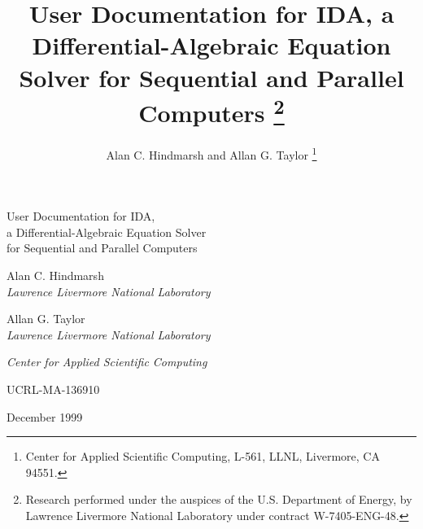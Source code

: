 



\setlength{\oddsidemargin}{0in}
\setlength{\evensidemargin}{0in}
\setlength{\textwidth}{6.5in}


\title{User Documentation for IDA, a Differential-Algebraic Equation
       Solver for Sequential and Parallel Computers%
\thanks{
Research performed under the auspices of the U.S.
Department of Energy, by Lawrence Livermore National Laboratory under
contract W-7405-ENG-48. } }

\author{Alan C. Hindmarsh and Allan G. Taylor%
\thanks{Center for Applied Scientific Computing, L-561,
        LLNL, Livermore, CA 94551.} }



\thispagestyle{empty}

%
%

%
\vspace*{\fill}
\vspace*{0.1in}

\begin{center}

\LARGE
User Documentation for IDA, \\ a Differential-Algebraic Equation Solver \\
       for Sequential and Parallel Computers

\par\vspace*{0.7in}
\large
Alan C. Hindmarsh\\{\em Lawrence Livermore National Laboratory}
\par\bigskip
Allan G. Taylor\\{\em Lawrence Livermore National Laboratory}

\end{center}

\vfill
\mbox{}
\vfill
\vspace*{3.5in}

%
\par\Large\it Center for Applied Scientific Computing
\vspace*{0.7in}
\par\large UCRL-MA-136910
\par\large December 1999

